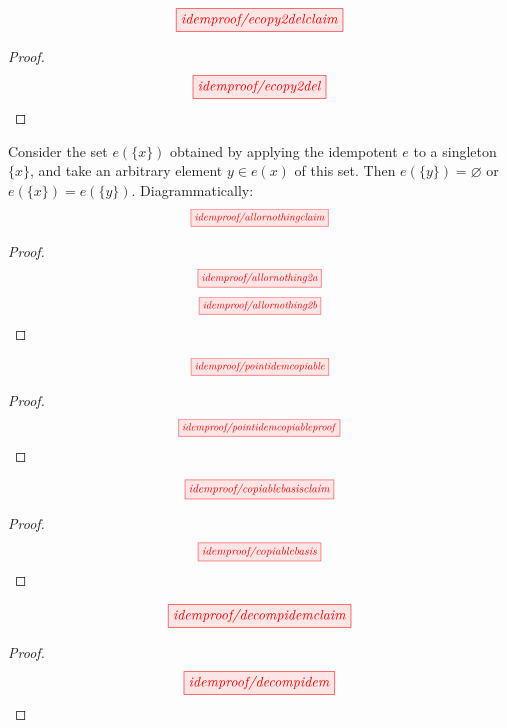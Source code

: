 \newpage
\begin{proposition}\label{prop:counitdelete}
\[\scalebox{1}{\tikzfig{idemproof/ecopy2delclaim}}\]
\begin{proof}
\[\scalebox{1}{\tikzfig{idemproof/ecopy2del}}\]
\end{proof}
\end{proposition}

\newpage
\begin{lemma}\label{lem:allornothing}
Consider the set $e(\{x\})$ obtained by applying the idempotent $e$ to a singleton $\{x\}$, and take an arbitrary element $y \in e(x)$ of this set. Then $e(\{y\}) = \varnothing$ or $e(\{x\}) = e(\{y\})$. Diagrammatically: \[\scalebox{0.75}{\tikzfig{idemproof/allornothingclaim}}\]
\begin{proof}
\[\scalebox{0.75}{\tikzfig{idemproof/allornothing2a}}\]
\[\scalebox{0.75}{\tikzfig{idemproof/allornothing2b}}\]
\end{proof}
\end{lemma}

\newpage
\vspace*{\fill}
\begin{proposition}\label{prop:epointcopy}
\[\scalebox{0.75}{\tikzfig{idemproof/pointidemcopiable}}\]
\begin{proof}
\[\scalebox{0.75}{\tikzfig{idemproof/pointidemcopiableproof}}\]
\end{proof}
\end{proposition}
\vspace*{\fill}

\newpage
\begin{proposition}\label{prop:copiablebasis}
\[\scalebox{0.8}{\tikzfig{idemproof/copiablebasisclaim}}\]
\begin{proof}
\[\scalebox{0.8}{\tikzfig{idemproof/copiablebasis}}\]
\end{proof}
\end{proposition}

\newpage
\vspace*{\fill}
\begin{proposition}\label{prop:decompidem}
\[\scalebox{1}{\tikzfig{idemproof/decompidemclaim}}\]
\begin{proof}
\[\scalebox{1}{\tikzfig{idemproof/decompidem}}\]
\end{proof}
\end{proposition}
\vspace*{\fill}

